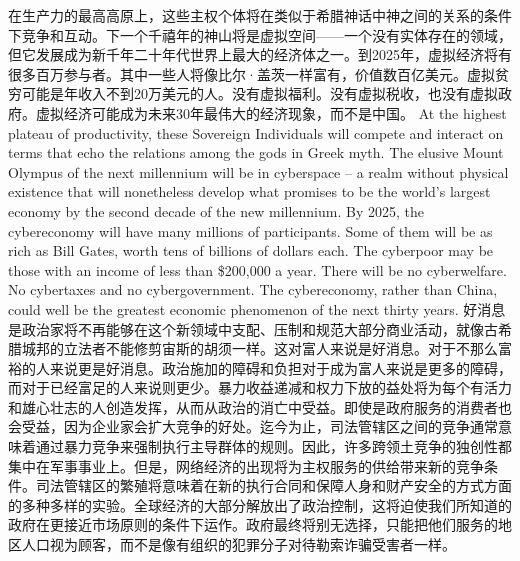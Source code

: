 \begin{paracol}{2}[]
\switchcolumn*
在生产力的最高高原上，这些主权个体将在类似于希腊神话中神之间的关系的条件下竞争和互动。下一个千禧年的神山将是虚拟空间——一个没有实体存在的领域，但它发展成为新千年二十年代世界上最大的经济体之一。到2025年，虚拟经济将有很多百万参与者。其中一些人将像比尔·盖茨一样富有，价值数百亿美元。虚拟贫穷可能是年收入不到20万美元的人。没有虚拟福利。没有虚拟税收，也没有虚拟政府。虚拟经济可能成为未来30年最伟大的经济现象，而不是中国。
\switchcolumn
At the highest plateau of productivity, these Sovereign Individuals will compete and interact on terms that echo the relations among the gods in Greek myth. The elusive Mount Olympus of the next millennium will be in cyberspace -- a realm without physical existence that will nonetheless develop what promises to be the world's largest economy by the second decade of the new millennium. By 2025, the cybereconomy will have many millions of participants. Some of them will be as rich as Bill Gates, worth tens of billions of dollars each. The cyberpoor may be those with an income of less than \$200,000 a year. There will be no cyberwelfare. No cybertaxes and no cybergovernment. The cybereconomy, rather than China, could well be the greatest economic phenomenon of the next thirty years.
\switchcolumn*
好消息是政治家将不再能够在这个新领域中支配、压制和规范大部分商业活动，就像古希腊城邦的立法者不能修剪宙斯的胡须一样。这对富人来说是好消息。对于不那么富裕的人来说更是好消息。政治施加的障碍和负担对于成为富人来说是更多的障碍，而对于已经富足的人来说则更少。暴力收益递减和权力下放的益处将为每个有活力和雄心壮志的人创造发挥，从而从政治的消亡中受益。即使是政府服务的消费者也会受益，因为企业家会扩大竞争的好处。迄今为止，司法管辖区之间的竞争通常意味着通过暴力竞争来强制执行主导群体的规则。因此，许多跨领土竞争的独创性都集中在军事事业上。但是，网络经济的出现将为主权服务的供给带来新的竞争条件。司法管辖区的繁殖将意味着在新的执行合同和保障人身和财产安全的方式方面的多种多样的实验。全球经济的大部分解放出了政治控制，这将迫使我们所知道的政府在更接近市场原则的条件下运作。政府最终将别无选择，只能把他们服务的地区人口视为顾客，而不是像有组织的犯罪分子对待勒索诈骗受害者一样。
\switchcolumn

\end{paracol}
